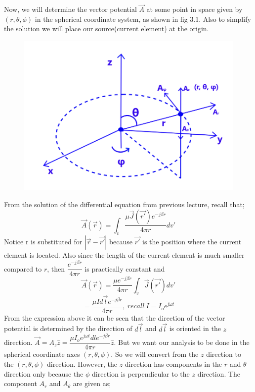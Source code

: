 Now, we will determine the vector potential $\vec{A}$ at some point in space given by $(r, \theta, \phi)$ in the spherical coordinate system, as shown in fig 3.1. Also to simplify the solution we will place our source(current element) at the origin.
\begin{figure}[h]
\includegraphics[width=1\linewidth]{./graphics/fig1_1}
\centering
\caption{}
\label{fig:1}
\end{figure}\newline
From the solution of the differential equation from previous lecture, recall that;
$$ \vec{A}(\vec{r}) =\int_v \dfrac{\mu \vec{J}(\vec{r'}) e^{-j\beta r}}{4\pi r}dv'$$ 
Notice r is substituted for $|\vec{r} - \vec{r'}|$ because $\vec{r'}$ is the position where the current element is located. Also since the length of the current element is much smaller compared to $r$, then $\dfrac{e^{-j\beta r}}{4 \pi r}$ is practically constant and 
$$ \vec{A}(\vec{r}) = \dfrac{\mu e^{-j\beta r}}{4 \pi r}\int_v\vec{J}(\vec{r'})dv'$$
$$  = \dfrac{\mu I d\vec{l} e^{-j\beta r}}{4\pi r}, \ recall \ I = I_oe^{j\omega t}$$
From the expression above it can be seen that the direction of the vector potential is determined by the direction of $d\vec{l}$ and $d\vec{l}$ is oriented in the $z$ direction. $\vec{A} = A_z\hat{z} = \dfrac{\mu I_o e^{j\omega t} dl e^{-j\beta r}}{4\pi r}\hat{z}$. But we want our analysis to be done in the spherical coordinate axes $(r, \theta, \phi)$. So we will convert from the $z$ direction to the $(r, \theta, \phi)$ direction. However, the $z$ direction has components in the $r$ and $\theta$ direction only because the $\phi$ direction is perpendicular to the $z$ direction. The component $A_{r}$ and $A_{\theta}$ are given as;
